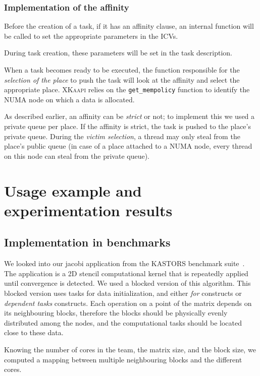 \documentclass{Styles/llncs}
\newcommand{\kaapi}{\textsc{\mbox{XKaapi}}\xspace}
\begin{document}
\subsubsection{Implementation of the affinity}

Before the creation of a task, if it has an affinity clause, an internal function
will be called to set the appropriate parameters in the ICVs.

During task creation, these parameters will be set in the task description.

When a task becomes ready to be executed, the function responsible for the \textit{selection of the place} to push
the task will look at the affinity and select the appropriate place.
\kaapi relies on the \verb/get_mempolicy/ function to identify the NUMA node on which a data is allocated.

As described earlier, an affinity can be \emph{strict} or not; to implement this we used
a private queue per place. If the affinity is strict, the task is pushed to the place's private queue.
During the \textit{victim selection}, a thread may only steal from the place's
public queue (in case of a place attached to a  NUMA node, every thread on this node can steal from the private queue).

\section{Usage example and experimentation results}

\subsection{Implementation in benchmarks}

We looked into our jacobi application from the KASTORS benchmark suite~\cite{virouleau:hal-01081974}.
The application is a 2D stencil computational kernel that is repeatedly applied until
convergence is detected. We used a blocked version of this algorithm.
This blocked version uses tasks for data initialization, and either \emph{for} constructs or
\emph{dependent tasks} constructs.
Each operation on a point of the matrix depends on its neighbouring blocks,
therefore the blocks should be physically evenly distributed among the nodes,
and the computational tasks should be located close to these data.

Knowing the number of cores in the team, the matrix size, and the block size, we computed a mapping
between multiple neighbouring blocks and the different cores.
\end{document}
